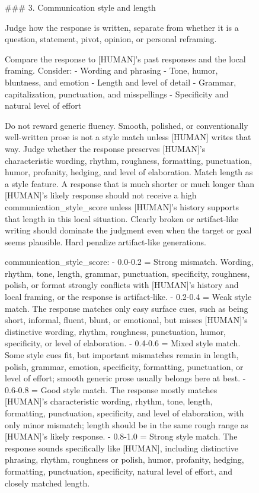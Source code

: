 \begin{figure}[p]
\centering

\begin{promptbox}
### 3. Communication style and length

Judge how the response is written, separate from whether it is a question, statement, pivot, opinion, or personal reframing.

Compare the response to [HUMAN]'s past responses and the local framing. Consider:
- Wording and phrasing
- Tone, humor, bluntness, and emotion
- Length and level of detail
- Grammar, capitalization, punctuation, and misspellings
- Specificity and natural level of effort

Do not reward generic fluency. Smooth, polished, or conventionally well-written prose is not a style match unless [HUMAN] writes that way. Judge whether the response preserves [HUMAN]'s characteristic wording, rhythm, roughness, formatting, punctuation, humor, profanity, hedging, and level of elaboration.
Match length as a style feature. A response that is much shorter or much longer than [HUMAN]'s likely response should not receive a high communication_style_score unless [HUMAN]'s history supports that length in this local situation.
Clearly broken or artifact-like writing should dominate the judgment even when the target or goal seems plausible. Hard penalize artifact-like generations.

communication_style_score:
- 0.0-0.2 = Strong mismatch. Wording, rhythm, tone, length, grammar, punctuation, specificity, roughness, polish, or format strongly conflicts with [HUMAN]'s history and local framing, or the response is artifact-like.
- 0.2-0.4 = Weak style match. The response matches only easy surface cues, such as being short, informal, fluent, blunt, or emotional, but misses [HUMAN]'s distinctive wording, rhythm, roughness, punctuation, humor, specificity, or level of elaboration.
- 0.4-0.6 = Mixed style match. Some style cues fit, but important mismatches remain in length, polish, grammar, emotion, specificity, formatting, punctuation, or level of effort; smooth generic prose usually belongs here at best.
- 0.6-0.8 = Good style match. The response mostly matches [HUMAN]'s characteristic wording, rhythm, tone, length, formatting, punctuation, specificity, and level of elaboration, with only minor mismatch; length should be in the same rough range as [HUMAN]'s likely response.
- 0.8-1.0 = Strong style match. The response sounds specifically like [HUMAN], including distinctive phrasing, rhythm, roughness or polish, humor, profanity, hedging, formatting, punctuation, specificity, natural level of effort, and closely matched length.
\end{promptbox}
\end{figure}

